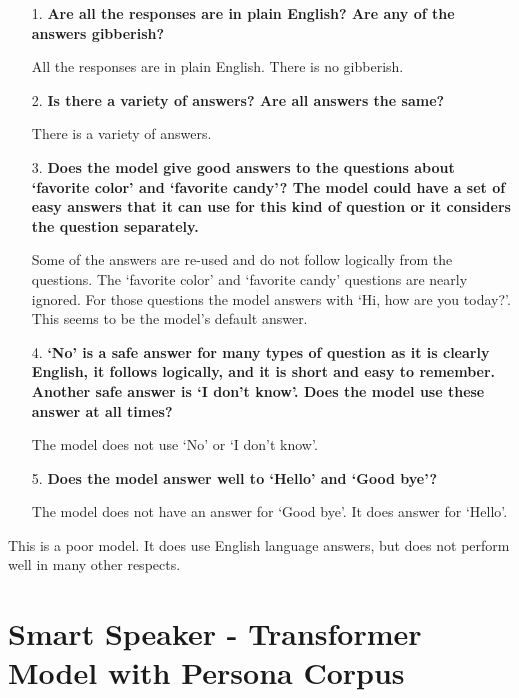 \begin{itemize}
	\item [1.] \textbf{Are all the responses are in plain English? Are any of the answers gibberish?}
	
	\item []All the responses are in plain English. There is no gibberish.
	
	\item [2.] \textbf{Is there a  variety of answers? Are all answers the same?}
	
	\item []There is a variety of answers. 
	
	\item [3.] \textbf{Does the model give good answers to the questions about `favorite color' and `favorite candy'? The model could have a set of easy answers that it can use for this kind of question or it considers the question separately.} 
	
	\item []Some of the answers are re-used and do not follow logically from the questions. The `favorite color' and `favorite candy' questions are nearly ignored. For those questions the model answers with `Hi, how are you today?'. This seems to be the model's default answer.
	
	\item [4.] \textbf{`No' is a safe answer for many types of question as it is clearly English, it follows logically, and it is short and easy to remember. Another safe answer is `I don't know'. Does the model use these answer at all times?}
	
	\item []The model does not use `No' or `I don't know'.
	
	\item [5.] \textbf{Does the model answer well to `Hello' and `Good bye'?}
	
	\item []The model does not have an answer for `Good bye'. It does answer for `Hello'.
	
\end{itemize}

This is a poor model. It does use English language answers, but does not perform well in many other respects.

\section{Smart Speaker - Transformer Model with Persona Corpus}

